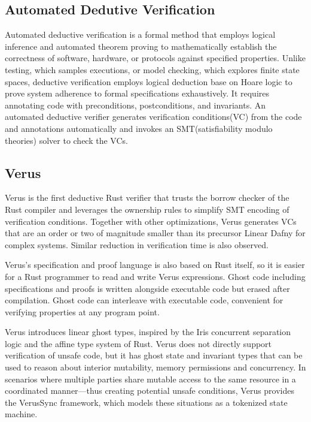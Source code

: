 \documentclass[conference]{IEEEtran}
\begin{document}
\subsection{Automated Dedutive Verification}
Automated deductive verification is a formal method that employs logical inference and automated theorem proving to mathematically establish the correctness of software, hardware, or protocols against specified properties. Unlike testing, which samples executions, or model checking, which explores finite state spaces, deductive verification employs logical deduction base on Hoare logic to prove system adherence to formal specifications exhaustively. It requires annotating code with preconditions, postconditions, and invariants. An automated deductive verifier generates verification conditions(VC) from the code and annotations automatically and invokes an SMT(satisfiability modulo theories) solver to check the VCs.

\subsection{Verus}
Verus\cite{verus} is the first deductive Rust verifier that trusts the borrow checker of the Rust compiler and leverages the ownership rules to simplify SMT encoding of verification conditions. Together with other optimizations, Verus generates VCs that are an order or two of magnitude smaller\cite{VerifyingConcurrentSystemsCode} than its precursor Linear Dafny\cite{linearDafny} for complex systems. Similar reduction in verification time is also observed. 

Verus's specification and proof language is also based on Rust itself, so it is easier for a Rust programmer to read and write Verus expressions. Ghost code including specifications and proofs is written alongside executable code but erased after compilation. Ghost code can interleave with executable code, convenient for verifying properties at any program point.   

Verus introduces linear ghost types, inspired by the Iris concurrent separation logic\cite{Iris_contributors_Iris} and the affine type system of Rust. Verus does not directly support verification of unsafe code, but it has ghost state and invariant types that can be used to reason about interior mutability, memory permissions and concurrency. In scenarios where multiple parties share mutable access to the same resource in a coordinated manner—thus creating potential unsafe conditions, Verus provides the VerusSync framework, which models these situations as a tokenized state machine.    
\end{document}
